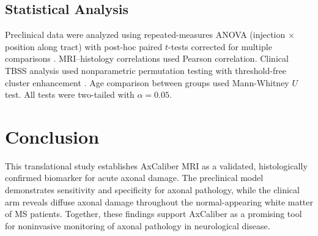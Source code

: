 \documentclass[11pt]{article}
\begin{document}
\subsection{Statistical Analysis}

Preclinical data were analyzed using repeated-measures ANOVA (injection $\times$ position along tract) with post-hoc paired $t$-tests corrected for multiple comparisons \citep{winkler2014permutation}. MRI--histology correlations used Pearson correlation. Clinical TBSS analysis used nonparametric permutation testing with threshold-free cluster enhancement \citep{smith2006tract}. Age comparison between groups used Mann-Whitney $U$ test. All tests were two-tailed with $\alpha = 0.05$.

\section{Conclusion}

This translational study establishes AxCaliber MRI as a validated, histologically confirmed biomarker for acute axonal damage. The preclinical model demonstrates sensitivity and specificity for axonal pathology, while the clinical arm reveals diffuse axonal damage throughout the normal-appearing white matter of MS patients. Together, these findings support AxCaliber as a promising tool for noninvasive monitoring of axonal pathology in neurological disease.



\end{document}
